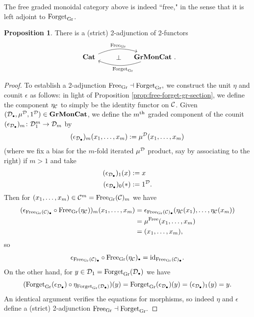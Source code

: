 \documentclass[openany, amssymb, psamsfonts]{amsart}
\theoremstyle{definition}
\newtheorem{prop}{Proposition}[section]
\numberwithin{equation}{section}
\begin{document}
The free graded monoidal category above is indeed ``free," in the sense that it is left adjoint to $\mathrm{Forget}_{\mathrm{Gr}}$.

\begin{prop} \label{prop:free-forget-adj-cat-grmoncat}
There is a (strict) 2-adjunction of 2-functors 
\begin{equation*}
    \begin{tikzcd}
        \Cat \ar[rr, bend left = 20, "\Free_\Gr" {xshift=1.5em}] \ar[rr, phantom, "\bot"{xshift = 0.6em}] && \GrMonCat \period \ar[ll, bend left = 20, "\Forget_\Gr" {xshift=0.5em}]
    \end{tikzcd}
\end{equation*}
\end{prop}

\begin{proof}
To establish a 2-adjunction $\mathrm{Free}_{\mathrm{Gr}} \dashv \mathrm{Forget}_{\mathrm{Gr}},$ we construct the unit $\eta$ and counit $\epsilon$ as follows: in light of Proposition \ref{prop:free-forget-gr-section}, we define the component $\eta_{\mathcal{C}}$ to simply be the identity functor on $\mathcal{C}$. Given $(\D_\sbull, \mu^\D, 1^\D) \in \GrMonCat$, we define the $m^\text{th}$ graded component of the counit $(\epsilon_{\D_\sbull})_m \colon \D_1^m \to \D_m$ by
$$
(\epsilon_{\D_\sbull})_m(x_1, \dots, x_m) := \mu^\D(x_1, \dots, x_m)
$$(where we fix a bias for the $m$-fold iterated $\mu^{\mathcal{D}}$ product, say by associating to the right) if $m > 1$ and take
\begin{align*}
(\epsilon_{\D_\sbull})_1(x) &:= x\\
(\epsilon_{\D_\sbull})_0(\ast) &:= 1^\D.
\end{align*}Then for $(x_1, \dots, x_m) \in \mathcal{C}^m = \mathrm{Free}_{\mathrm{Gr}}(\mathcal{C})_m$ we have
\begin{align*}
(\epsilon_{\Free_\Gr(\C)_\sbull} \circ \Free_\Gr(\eta_\C))_m(x_1, \dots, x_m) &= \epsilon_{\Free_\Gr(\C)_\sbull}(\eta_\C(x_1), \dots, \eta_\C(x_m))\\
&= \mu^\Free(x_1, \dots, x_m)\\
&= (x_1, \dots, x_m),
\end{align*}so $$\epsilon_{\Free_\Gr(\C)_\sbull} \circ \Free_\Gr(\eta_\C)_\sbull = \id_{\Free_\Gr(\C)_\sbull}.$$ On the other hand, for $y \in \D_1 = \Forget_\Gr(\D_\sbull)$ we have
$$
(\Forget_\Gr(\epsilon_{\D_\sbull}) \circ \eta_{\Forget_\Gr(\D_\sbull)})(y) = \Forget_\Gr(\epsilon_{\mathrm{\D_\sbull}})(y) = ({\epsilon_{\D_\sbull}})_1(y) = y.
$$An identical argument verifies the equations for morphisms, so indeed $\eta$ and $\epsilon$ define a (strict) 2-adjunction $\mathrm{Free}_{\mathrm{Gr}} \dashv \mathrm{Forget}_{\mathrm{Gr}}.$ 
\end{proof}
\end{document}
